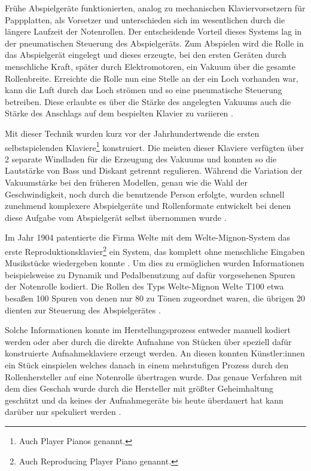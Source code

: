 Frühe Abspielgeräte funktionierten, analog zu mechanischen Klaviervorsetzern für Pappplatten, als Vorsetzer und unterschieden sich im wesentlichen durch die längere Laufzeit der Notenrollen.
Der entscheidende Vorteil dieses Systems lag in der pneumatischen Steuerung des Abspielgeräts.
Zum Abspielen wird die Rolle in das Abspielgerät eingelegt und dieses erzeugte, bei den ersten Geräten durch menschliche Kraft, später durch Elektromotoren, ein Vakuum über die gesamte Rollenbreite.
Erreichte die Rolle nun eine Stelle an der ein Loch vorhanden war, kann die Luft durch das Loch strömen und so eine pneumatische Steuerung betreiben.
Diese erlaubte es über die Stärke des angelegten Vakuums auch die Stärke des Anschlags auf dem bespielten Klavier zu variieren \parencite[III.5.d. Selbstspielende Klaviere]{mgg_mechanische}.

Mit dieser Technik wurden kurz vor der Jahrhundertwende die ersten selbstspielenden Klaviere\footnote{Auch Player Pianos genannt.} konstruiert.
Die meisten dieser Klaviere verfügten über 2 separate Windladen für die Erzeugung des Vakuums und konnten so die Lautstärke von Bass und Diskant getrennt regulieren.
Während die Variation der Vakuumstärke bei den früheren Modellen, genau wie die Wahl der Geschwindigkeit, noch durch die benutzende Person erfolgte, wurden schnell zunehmend komplexere Abspielgeräte und Rollenformate entwickelt bei denen diese Aufgabe vom Abspielgerät selbst übernommen wurde \parencite[III.5.d. Selbstspielende Klaviere]{mgg_mechanische}.

Im Jahr 1904 patentierte die Firma Welte mit dem Welte-Mignon-System das erste Reproduktionsklavier\footnote{Auch Reproducing Player Piano genannt.} ein System, das komplett ohne menschliche Eingaben Musikstücke wiedergeben konnte \parencite[]{mgg_mechanische}.
Um dies zu ermöglichen wurden Informationen beispielsweise zu Dynamik und Pedalbenutzung auf dafür vorgesehenen Spuren der Notenrolle kodiert.
Die Rollen des Typs Welte-Mignon Welte T100 etwa besaßen 100 Spuren von denen nur 80 zu Tönen zugeordnet waren, die übrigen 20 dienten zur Steuerung des Abspielgerätes \parencite[]{mxp_2002522}.

Solche Informationen konnte im Herstellungsprozess entweder manuell kodiert werden oder aber durch die direkte Aufnahme von Stücken über speziell dafür konstruierte Aufnahmeklaviere erzeugt werden.
An diesen konnten Künstler:innen ein Stück einspielen welches danach in einem mehrstufigen Prozess durch den Rollenhersteller auf eine Notenrolle übertragen wurde.
Das genaue Verfahren mit dem dies Geschah wurde durch die Hersteller mit größter Geheimhaltung geschützt und da keines der Aufnahmegeräte bis heute überdauert hat kann darüber nur spekuliert werden \parencite[]{zoltan_1994}.

